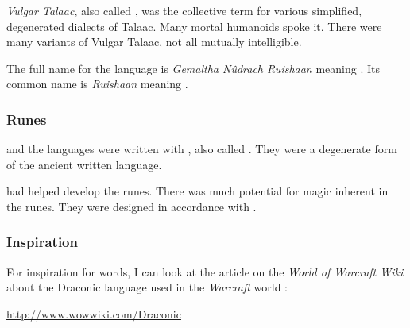 




\subsubsection{\CommonDraconic}
\emph{Vulgar Talaac}, also called \emph{\CommonDraconic}, was the collective term for various simplified, degenerated dialects of Talaac. 
Many mortal humanoids spoke it.
There were many variants of Vulgar Talaac, not all mutually intelligible. 

The full name for the language is \emph{Gemaltha N\^udrach Ruishaan} meaning .
Its common name is \emph{Ruishaan} meaning .





\subsubsection{Runes}
\Draconic and the \quiljaaran languages were written with , also called .
They were a degenerate form of the ancient \ophidian written language.

\Sethicus had helped develop the runes. 
There was much potential for magic inherent in the runes. 
They were designed in accordance with . 





\subsubsection{Inspiration}
For inspiration for \Draconic words, I can look at the article on the \emph{World of Warcraft Wiki} about the Draconic language used in the \emph{Warcraft} world \cite{VideoGame:Warcraft}: 

\href{http://www.wowwiki.com/Draconic}{http://www.wowwiki.com/Draconic}









